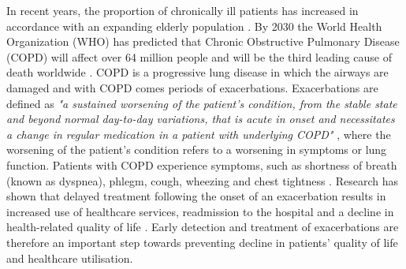In recent years, the proportion of chronically ill patients has increased in accordance with an expanding elderly population \citep{motWHO}. By 2030 the World Health Organization (WHO) has predicted that Chronic Obstructive Pulmonary Disease (COPD) will affect over 64 million people and will be the third leading cause of death worldwide \citep{motStat}. COPD is a progressive lung disease in which the airways are damaged and with COPD comes periods of exacerbations. Exacerbations are defined as \textit{"a sustained worsening of the patient's condition, from the stable state and beyond normal day-to-day variations, that is acute in onset and necessitates a change in regular medication in a patient with underlying COPD"} \citep{motExace}, where the worsening of the patient's condition refers to a worsening in symptoms or lung function. Patients with COPD experience symptoms, such as shortness of breath (known as dyspnea), phlegm, cough, wheezing and chest tightness
 \citep{motSymp}. 
 Research has shown that delayed treatment following the onset of an exacerbation results in increased use of healthcare services, readmission to the hospital and a decline in health-related quality of life \citep{motExace}. Early detection and treatment of exacerbations are therefore an important step towards preventing decline in patients' quality of life and healthcare utilisation.  



